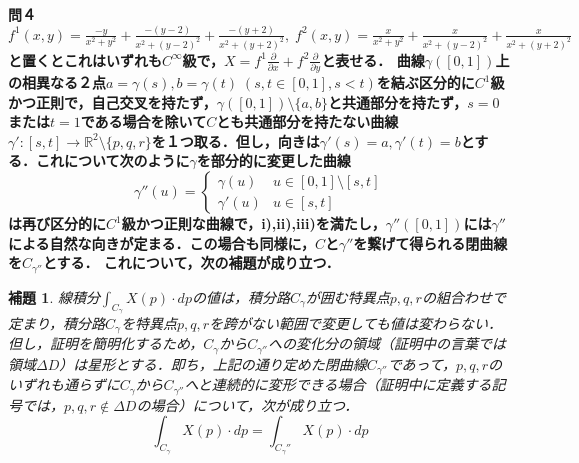 \documentclass[dvipdfmx,a4paper,uplatex]{jsarticle}
\newtheorem*{lemma*}{補題}
\begin{document}
\bf{問４} $f^1(x,y)=\frac{-y}{x^2+y^2}+\frac{-(y-2)}{x^2+(y-2)^2}+\frac{-(y+2)}{x^2+(y+2)^2},\; f^2(x,y)=\frac{x}{x^2+y^2}+\frac{x}{x^2+(y-2)^2}+\frac{x}{x^2+(y+2)^2}$と置くとこれはいずれも$C^\infty$級で，$X=f^1\frac{\partial}{\partial x}+f^2\frac{\partial}{\partial y}$と表せる．
曲線$\gamma([0,1])$上の相異なる２点$a=\gamma(s),b=\gamma(t)\;(s,t\in[0,1],s<t)$を結ぶ区分的に$C^1$級かつ正則で，自己交叉を持たず，$\gamma([0,1])\setminus \{a,b\}$と共通部分を持たず，$s=0$または$t=1$である場合を除いて$C$とも共通部分を持たない曲線$\gamma':[s,t]\to\mathbb{R}^2\setminus\{p,q,r\}$を１つ取る．但し，向きは$\gamma'(s)=a,\gamma'(t)=b$とする．これについて次のように$\gamma$を部分的に変更した曲線
\[\gamma''(u)=\begin{cases}
    \gamma(u) & u\in [0,1]\setminus [s,t]\\
    \gamma'(u) & u\in [s,t]
\end{cases}\]
は再び区分的に$C^1$級かつ正則な曲線で，i),ii),iii)を満たし，$\gamma''([0,1])$には$\gamma''$による自然な向きが定まる．この場合も同様に，$C$と$\gamma''$を繋げて得られる閉曲線を$C_{\gamma''}$とする．
これについて，次の補題が成り立つ．
\begin{lemma*}
    線積分$\int_{C_\gamma}X(p)\cdot dp$の値は，積分路$C_\gamma$が囲む特異点$p,q,r$の組合わせで定まり，積分路$C_\gamma$を特異点$p,q,r$を跨がない範囲で変更しても値は変わらない．
    但し，証明を簡明化するため，$C_\gamma$から$C_{\gamma''}$への変化分の領域（証明中の言葉では領域$\Delta D$）は星形とする．即ち，上記の通り定めた閉曲線$C_{\gamma''}$であって，$p,q,r$のいずれも通らずに$C_\gamma$から$C_{\gamma''}$へと連続的に変形できる場合（証明中に定義する記号では，$p,q,r\notin \Delta D$の場合）について，次が成り立つ．
    \[ \int_{C_\gamma}X(p)\cdot dp = \int_{C_\gamma''}X(p)\cdot dp \]
\end{lemma*}
\end{document}
